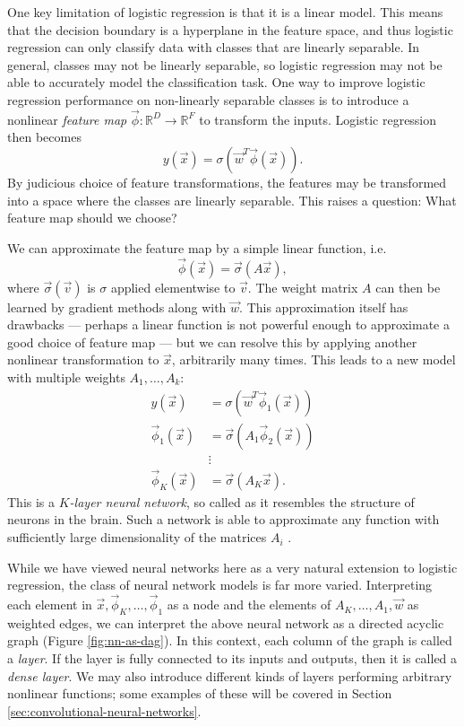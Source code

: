         One key limitation of logistic regression is that it is a linear model.
        This means that the decision boundary is a hyperplane in the feature
        space, and thus logistic regression can only classify data with classes
        that are linearly separable. In general, classes may not be linearly
        separable, so logistic regression may not be able to accurately model
        the classification task. One way to improve logistic regression
        performance on non-linearly separable classes is to introduce a
        nonlinear \emph{feature map} $\vec\phi : \mathbb{R}^D \to \mathbb{R}^F$
        to transform the inputs. Logistic regression then becomes
        \[
            y(\vec x) = \sigma(\vec w^T \vec\phi(\vec x)).
        \]
        By judicious choice of feature transformations, the features may be
        transformed into a space where the classes are linearly separable. This
        raises a question: What feature map should we choose?

        We can approximate the feature map by a simple linear function, i.e.
        \[
            \vec\phi(\vec x) = \vec\sigma(A \vec x),
        \]
        where $\vec\sigma(\vec v)$ is $\sigma$ applied elementwise to $\vec v$.
        The weight matrix $A$ can then be learned by gradient methods along with
        $\vec w$. This approximation itself has drawbacks --- perhaps a linear
        function is not powerful enough to approximate a good choice of feature
        map --- but we can resolve this by applying another nonlinear
        transformation to $\vec x$, arbitrarily many times. This leads to a new
        model with multiple weights $A_1, \dots, A_k$:
        \begin{align*}
            y(\vec x) &= \sigma(\vec w^T \vec\phi_1(\vec x))\\
            \vec\phi_1(\vec x) &= \vec\sigma(A_1 \vec\phi_2(\vec x))\\
            &\vdots\\
            \vec\phi_K(\vec x) &= \vec\sigma(A_K \vec x).
        \end{align*}
        This is a \emph{$K$-layer neural network}, so called as it resembles
        the structure of neurons in the brain. Such a network is able to
        approximate any function with sufficiently large dimensionality of the
        matrices $A_i$ \citep{gybenko89}.

        While we have viewed neural networks here as a very natural extension
        to logistic regression, the class of neural network models is far more
        varied. Interpreting each element in $\vec x, \vec \phi_K, \dots, \vec
        \phi_1$ as a node and the elements of $A_K, \dots, A_1, \vec w$ as
        weighted edges, we can interpret the above neural network as a directed
        acyclic graph (Figure \ref{fig:nn-as-dag}). In this context, each column
        of the graph is called a \emph{layer}. If the layer is fully connected
        to its inputs and outputs, then it is called a \emph{dense layer}. We
        may also introduce different kinds of layers performing arbitrary
        nonlinear functions; some examples of these will be covered in Section
        \ref{sec:convolutional-neural-networks}.

